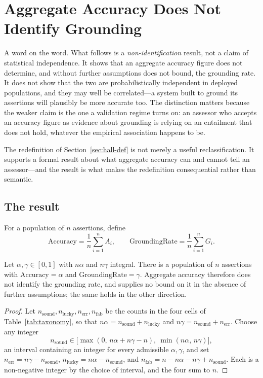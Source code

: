 \section{Aggregate Accuracy Does Not Identify Grounding}
\label{sec:independence}

A word on the word. What follows is a \emph{non-identification} result, not a claim of
statistical independence. It shows that an aggregate accuracy figure does not determine,
and without further assumptions does not bound, the grounding rate. It does not show that
the two are probabilistically independent in deployed populations, and they may well be
correlated---a system built to ground its assertions will plausibly be more accurate too.
The distinction matters because the weaker claim is the one a validation regime turns on:
an assessor who accepts an accuracy figure as evidence about grounding is relying on an
entailment that does not hold, whatever the empirical association happens to be.

The redefinition of Section~\ref{sec:hall-def} is not merely a useful
reclassification. It supports a formal result about what aggregate accuracy can and
cannot tell an assessor---and the result is what makes the redefinition consequential
rather than semantic.

\subsection{The result}

For a population of $n$ assertions, define
\begin{equation}
  \mathrm{Accuracy} = \frac{1}{n}\sum_{i=1}^{n} A_i,
  \qquad
  \mathrm{GroundingRate} = \frac{1}{n}\sum_{i=1}^{n} G_i.
  \label{eq:rates}
\end{equation}

\begin{proposition}
\label{prop:independence}
Let $\alpha, \gamma \in [0,1]$ with $n\alpha$ and $n\gamma$ integral. There is a
population of $n$ assertions with $\mathrm{Accuracy} = \alpha$ and
$\mathrm{GroundingRate} = \gamma$. Aggregate accuracy therefore does not identify the
grounding rate, and supplies no bound on it in the absence of further assumptions; the
same holds in the other direction.
\end{proposition}

\begin{proof}
Let $n_{\mathrm{sound}}, n_{\mathrm{lucky}}, n_{\mathrm{err}}, n_{\mathrm{fab}}$
be the counts in the four cells of Table~\ref{tab:taxonomy}, so that
$n\alpha = n_{\mathrm{sound}} + n_{\mathrm{lucky}}$ and
$n\gamma = n_{\mathrm{sound}} + n_{\mathrm{err}}$. Choose any integer
\[
  n_{\mathrm{sound}} \in
  \bigl[\max(0,\, n\alpha + n\gamma - n),\ \min(n\alpha,\, n\gamma)\bigr],
\]
an interval containing an integer for every admissible $\alpha, \gamma$, and set
$n_{\mathrm{err}} = n\gamma - n_{\mathrm{sound}}$,
$n_{\mathrm{lucky}} = n\alpha - n_{\mathrm{sound}}$, and
$n_{\mathrm{fab}} = n - n\alpha - n\gamma + n_{\mathrm{sound}}$. Each is a
non-negative integer by the choice of interval, and the four sum to $n$.
\end{proof}

